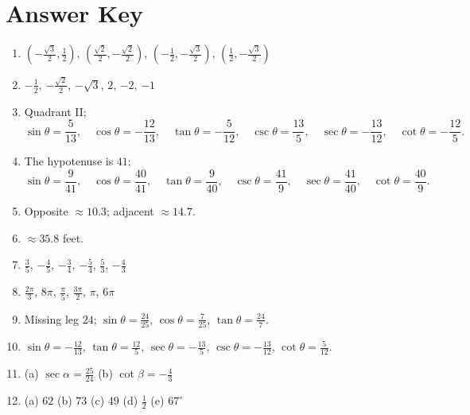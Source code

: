 \documentclass[12pt]{article}
\begin{document}
\section*{Answer Key}
\begin{enumerate}[leftmargin=*,itemsep=0.8em]
  \item $\left(-\frac{\sqrt3}{2},\frac12\right)$, $\left(\frac{\sqrt2}{2},-\frac{\sqrt2}{2}\right)$, $\left(-\frac12,-\frac{\sqrt3}{2}\right)$, $\left(\frac12,-\frac{\sqrt3}{2}\right)$

  \item $-\frac12$, $-\frac{\sqrt2}{2}$, $-\sqrt3$, $2$, $-2$, $-1$

  \item Quadrant II;
  \[
  \sin\theta=\frac5{13},\quad \cos\theta=-\frac{12}{13},\quad
  \tan\theta=-\frac5{12},\quad \csc\theta=\frac{13}{5},\quad
  \sec\theta=-\frac{13}{12},\quad \cot\theta=-\frac{12}{5}.
  \]

  \item The hypotenuse is $41$;
  \[
  \sin\theta=\frac9{41},\quad \cos\theta=\frac{40}{41},\quad
  \tan\theta=\frac9{40},\quad \csc\theta=\frac{41}{9},\quad
  \sec\theta=\frac{41}{40},\quad \cot\theta=\frac{40}{9}.
  \]

  \item Opposite $\approx10.3$; adjacent $\approx14.7$.

  \item $\approx35.8$ feet.

  \item $\frac35$, $-\frac45$, $-\frac34$, $-\frac54$, $\frac53$, $-\frac43$

  \item $\frac{2\pi}{3}$, $8\pi$, $\frac\pi5$, $\frac{3\pi}{2}$, $\pi$, $6\pi$

  \item Missing leg $24$; $\sin\theta=\frac{24}{25}$, $\cos\theta=\frac7{25}$, $\tan\theta=\frac{24}{7}$.

  \item $\sin\theta=-\frac{12}{13}$, $\tan\theta=\frac{12}{5}$, $\sec\theta=-\frac{13}{5}$, $\csc\theta=-\frac{13}{12}$, $\cot\theta=\frac5{12}$.

  \item (a) $\sec\alpha=\frac{25}{24}$ \qquad (b) $\cot\beta=-\frac43$

  \item (a) $62$ \quad (b) $73$ \quad (c) $49$ \quad (d) $\frac12$ \quad (e) $67^\circ$
\end{enumerate}
\end{document}

